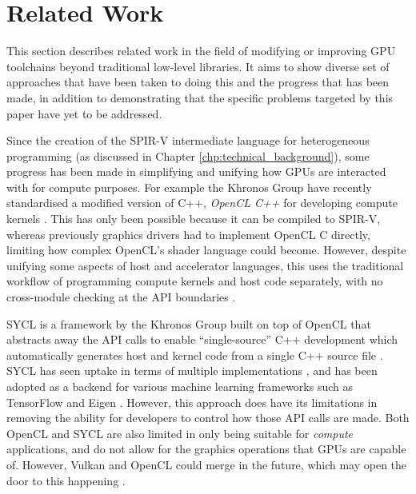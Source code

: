\documentclass[a4paper,12pt,twoside,openright]{report}
\begin{document}
\section{Related Work}

\label{sec:related_work}

This section describes related work in the field of modifying or improving GPU
toolchains beyond traditional low-level libraries. It aims to show diverse set
of approaches that have been taken to doing this and the progress that has been
made, in addition to demonstrating that the specific problems targeted by this
paper have yet to be addressed.

Since the creation of the SPIR-V intermediate language for heterogeneous
programming (as discussed in Chapter \ref{chp:technical_background}), some
progress has been made in simplifying and unifying how GPUs are interacted with
for compute purposes. For example the Khronos Group have recently standardised
a modified version of C++, \textit{OpenCL C++} for developing compute kernels
\cite{OpenCL22Release} \cite{OpenCLCPPWhitePaper} \cite{OpenCL}. This has only
been possible because it can be compiled to SPIR-V, whereas previously graphics
drivers had to implement OpenCL C directly, limiting how complex OpenCL's
shader language could become. However, despite unifying some aspects of host
and accelerator languages, this uses the traditional workflow of programming
compute kernels and host code separately, with no cross-module checking at the
API boundaries \cite{OpenCL22Release}.

SYCL is a framework by the Khronos Group built on top of OpenCL that abstracts
away the API calls to enable ``single-source'' C++ development which
automatically generates host and kernel code from a single C++ source file
\cite{OpenCL22Release} \cite{SYCL}. SYCL has seen uptake in terms of multiple
implementations \cite{ComputeCPP} \cite{triSYCL}, and has been adopted as a
backend for various machine learning frameworks such as TensorFlow and Eigen
\cite{SYCLTensorFlow} \cite{SYCLEigen}. However, this approach does have its
limitations in removing the ability for developers to control how those API
calls are made. Both OpenCL and SYCL are also limited in only being suitable
for \textit{compute} applications, and do not allow for the graphics operations
that GPUs are capable of. However, Vulkan and OpenCL could merge in the future,
which may open the door to this happening \cite{VulkanOpenCLMerge}.
\end{document}
